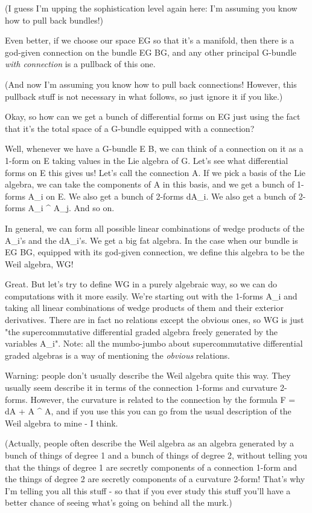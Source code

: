 (I guess I'm upping the sophistication level again here: I'm assuming
you know how to pull back bundles!)  

Even better, if we choose our space EG so that it's a manifold, then
there is a god-given connection on the bundle EG \to  BG, and any other
principal G-bundle \emph{with connection} is a pullback of this one.  

(And now I'm assuming you know how to pull back connections!  However,
this pullback stuff is not necessary in what follows, so just ignore it
if you like.)

Okay, so how can we get a bunch of differential forms on EG just using
the fact that it's the total space of a G-bundle equipped with a connection? 

Well, whenever we have a G-bundle E \to  B, we can think of a connection on
it as a 1-form on E taking values in the Lie algebra of G.  Let's see what
differential forms on E this gives us!   Let's call the connection A.  If
we pick a basis of the Lie algebra, we can take the components of A in
this basis, and we get a bunch of 1-forms A_{i} on E.   
We also get a bunch of 2-forms dA_{i}.  
We also get a bunch of 2-forms A_{i} ^ A_{j}.  And so on.


In general, we can form all possible linear combinations of wedge products 
of the A_{i}'s and the dA_{i}'s.  
We get a big fat algebra.  In the case when
our bundle is EG \to  BG, equipped with its god-given connection, we define
this algebra to be the Weil algebra, WG!  

Great.  But let's try to define WG in a purely algebraic way, so we can
do computations with it more easily.  We're starting out with the
1-forms A_{i} and taking all linear 
combinations of wedge products of them
and their exterior derivatives.  There are in fact no relations except
the obvious ones, so WG is just "the supercommutative differential
graded algebra freely generated by the variables A_{i}".    
Note: all the
mumbo-jumbo about supercommutative differential graded algebras is a way
of mentioning the \emph{obvious} relations.

Warning: people don't usually describe the Weil algebra quite this way.  
They usually seem describe it in terms of the connection 1-forms and
curvature 2-forms.  However, the curvature is related to the connection by
the formula F = dA + A ^ A, and if you use this you can go from the usual 
description of the Weil algebra to mine - I think.

(Actually, people often describe the Weil algebra as an algebra generated
by a bunch of things of degree 1 and a bunch of things of degree 2, without
telling you that the things of degree 1 are secretly components of a
connection 1-form and the things of degree 2 are secretly components of
a curvature 2-form!  That's why I'm telling you all this stuff - so that
if you ever study this stuff you'll have a better chance of seeing what's
going on behind all the murk.)

